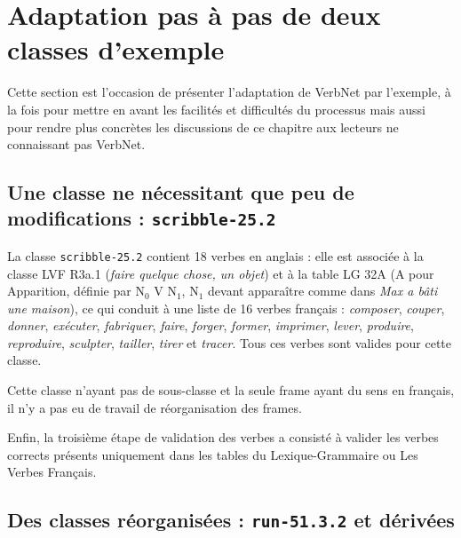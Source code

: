\section{Adaptation pas à pas de deux classes d'exemple}
\label{exempleadaptation}

Cette section est l'occasion de présenter l'adaptation de VerbNet par
l'exemple, à la fois pour mettre en avant les facilités et difficultés du
processus mais aussi pour rendre plus concrètes les discussions de ce chapitre
aux lecteurs ne connaissant pas VerbNet.

\subsection{Une classe ne nécessitant que peu de modifications :
\texttt{scribble-25.2}}
\label{exemple_scribble}

La classe {\color{blue}\texttt{scribble-25.2}} contient 18 verbes en anglais :
elle est associée à la classe LVF {\color{red}R3a.1} (\textit{faire quelque
chose, un objet}) et à la table LG {\color{green}32A} (A pour Apparition,
définie par N$_0$ V N$_1$, N$_1$ devant apparaître comme dans \textit{Max a
bâti une maison}), ce qui conduit à une liste de 16 verbes français :
\textit{composer}, \textit{couper}, \textit{donner}, \textit{exécuter},
\textit{fabriquer}, \textit{faire}, \textit{forger}, \textit{former},
\textit{imprimer}, \textit{lever}, \textit{produire}, \textit{reproduire},
\textit{sculpter}, \textit{tailler}, \textit{tirer} et \textit{tracer}. Tous
ces verbes sont valides pour cette classe.

Cette classe n'ayant pas de sous-classe et la seule frame ayant du sens en
français, il n'y a pas eu de travail de réorganisation des frames.

Enfin, la troisième étape de validation des verbes a consisté à valider les
verbes corrects présents uniquement dans les tables du Lexique-Grammaire ou Les
Verbes Français.

\subsection{Des classes réorganisées : \texttt{run-51.3.2} et dérivées}

